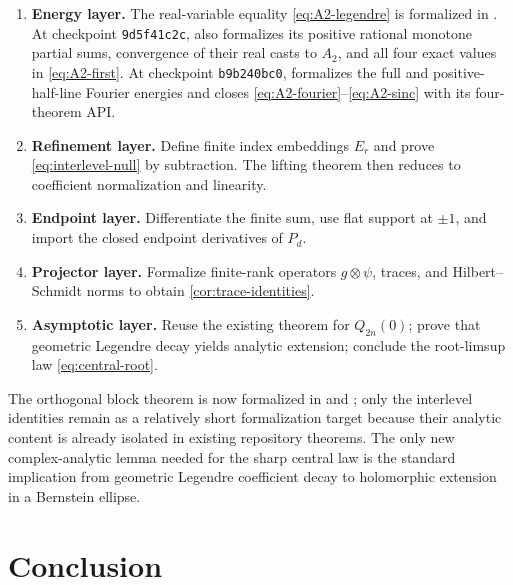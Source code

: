 \documentclass[11pt,oneside]{article}
\numberwithin{equation}{section}
\theoremstyle{definition}
\theoremstyle{remark}
\begin{document}
\begin{enumerate}
 synthesis at $4^N$, and convergence of the common-mesh partial trains to $u$
 in $C([-1,1])$, with raw uniform, norm-error, and pointwise forms.  Rationality
 of those atom rows, equality of the two
 coefficient vectors, an unconditional $\operatorname{natDegree}(S_N)=2N$
 statement, and nonvanishing of the top Legendre coefficient remain outside
 these APIs; the natural degree and leading coefficient of $C_N$ are proved equal to
 those of $S_N$, including degenerate drops.
 \item \textbf{Energy layer.}  The real-variable equality
 \eqref{eq:A2-legendre} is formalized in .
 At checkpoint \texttt{9d5f41c2c},
  also formalizes its positive rational
 monotone partial sums, convergence of their real casts to $A_2$, and all four
 exact values in \eqref{eq:A2-first}.  At checkpoint \texttt{b9b240bc0},
  formalizes the full and positive-half-line
 Fourier energies and closes \eqref{eq:A2-fourier}--\eqref{eq:A2-sinc} with its
 four-theorem API.
 \item \textbf{Refinement layer.}  Define finite index embeddings $E_r$ and
 prove \eqref{eq:interlevel-null} by subtraction.  The lifting theorem then
 reduces to coefficient normalization and linearity.
 \item \textbf{Endpoint layer.}  Differentiate the finite sum, use flat support
 at $\pm1$, and import the closed endpoint derivatives of $P_d$.
 \item \textbf{Projector layer.}  Formalize finite-rank operators
 $g\otimes\psi$, traces, and Hilbert--Schmidt norms to obtain
 \cref{cor:trace-identities}.
 \item \textbf{Asymptotic layer.}  Reuse the existing theorem for
 $Q_{2n}(0)$; prove that geometric Legendre decay yields analytic extension;
 conclude the root-limsup law \eqref{eq:central-root}.
\end{enumerate}

The orthogonal block theorem is now formalized in 
and ; only the interlevel identities remain
as a relatively short formalization target because their analytic content is already
isolated in existing repository theorems.  The only new complex-analytic lemma needed
for the sharp central law is the standard implication from geometric Legendre coefficient decay to holomorphic extension in a Bernstein ellipse.

\section{Conclusion}
\label{sec:conclusion}
\end{document}
